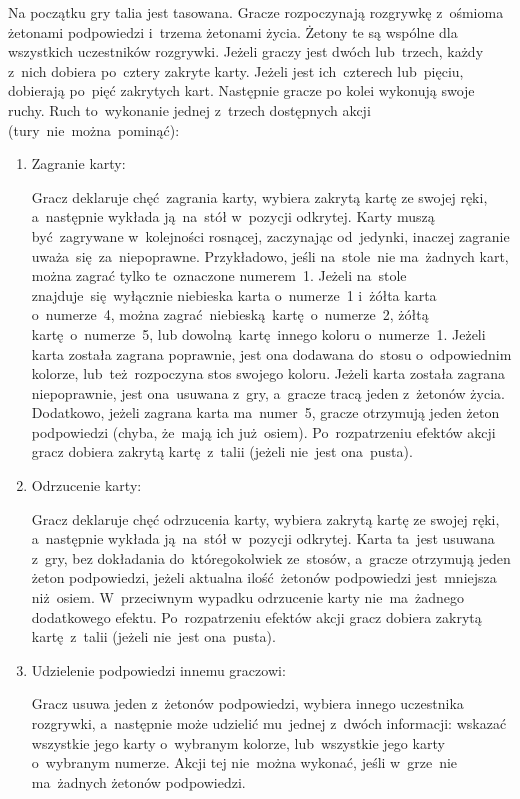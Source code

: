 \documentclass[declaration,shortabstract,inz]{iithesis}
\begin{document}
Na początku gry talia jest tasowana. Gracze rozpoczynają rozgrywkę z~ośmioma żetonami podpowiedzi i~trzema żetonami życia. Żetony te są wspólne dla wszystkich uczestników rozgrywki. Jeżeli graczy jest dwóch lub~trzech, każdy z~nich dobiera po~cztery zakryte karty. Jeżeli jest ich~czterech lub~pięciu, dobierają po~pięć zakrytych kart. Następnie gracze po kolei wykonują swoje ruchy. Ruch to~wykonanie jednej z~trzech dostępnych akcji (tury~nie~można~pominąć):
\begin{enumerate}
	\item Zagranie karty:

	Gracz deklaruje chęć zagrania karty, wybiera zakrytą kartę ze swojej ręki, a~następnie wykłada ją~na~stół w~pozycji odkrytej. Karty muszą być~zagrywane w~kolejności rosnącej, zaczynając od~jedynki, inaczej zagranie uważa~się za~niepoprawne. Przykładowo, jeśli na~stole~nie ma~żadnych kart, można zagrać tylko te~oznaczone numerem~1. Jeżeli na~stole znajduje~się wyłącznie niebieska karta o~numerze~1 i~żółta karta o~numerze~4, można zagrać niebieską kartę o~numerze~2, żółtą kartę o~numerze~5, lub dowolną kartę innego koloru o~numerze~1. Jeżeli karta została zagrana poprawnie, jest ona dodawana do~stosu o~odpowiednim kolorze, lub~też~rozpoczyna stos swojego koloru. Jeżeli karta została zagrana niepoprawnie, jest ona~usuwana z~gry, a~gracze tracą jeden z~żetonów życia. Dodatkowo, jeżeli zagrana karta ma~numer~5, gracze otrzymują jeden żeton podpowiedzi (chyba, że~mają ich już osiem). Po~rozpatrzeniu efektów akcji gracz dobiera zakrytą kartę z~talii (jeżeli nie~jest ona~pusta).
	
	\item Odrzucenie karty:
 
	Gracz deklaruje chęć odrzucenia karty, wybiera zakrytą kartę ze swojej ręki, a~następnie wykłada ją~na~stół w~pozycji odkrytej. Karta ta~jest usuwana z~gry, bez dokładania do~któregokolwiek ze~stosów, a~gracze otrzymują jeden żeton podpowiedzi, jeżeli aktualna ilość żetonów podpowiedzi jest~mniejsza niż~osiem. W~przeciwnym wypadku odrzucenie karty nie~ma~żadnego dodatkowego efektu. Po~rozpatrzeniu efektów akcji gracz dobiera zakrytą kartę z~talii (jeżeli nie~jest ona~pusta).

	\item Udzielenie podpowiedzi innemu graczowi:

	Gracz usuwa jeden z~żetonów podpowiedzi, wybiera innego uczestnika rozgrywki, a~następnie może udzielić mu~jednej z~dwóch informacji: wskazać wszystkie jego karty o~wybranym kolorze, lub~wszystkie jego karty o~wybranym numerze. Akcji tej nie~można wykonać, jeśli w~grze~nie ma~żadnych żetonów podpowiedzi.
\end{enumerate}
\end{document}
